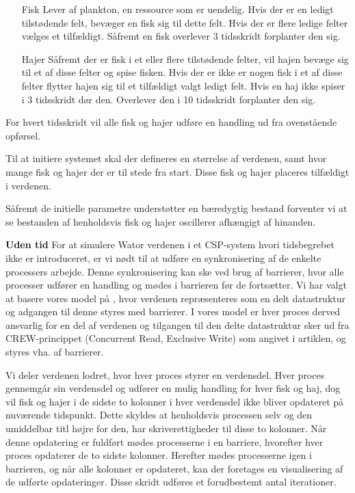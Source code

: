 \begin{itemize}
\item[Fisk]
Lever af plankton, en ressource som er uendelig. Hvis der er en ledigt 
tilstødende felt, bevæger en fisk sig til dette felt. Hvis der er flere ledige 
felter vælges et tilfældigt. Såfremt en fisk overlever 3 tidsskridt forplanter 
den sig.
\item[Hajer]
Såfremt der er fisk i et eller flere tilstødende felter, vil hajen bevæge sig 
til et af disse felter og spise fisken. Hvis der er ikke er nogen fisk i et af 
disse felter flytter hajen sig til et tilfældigt valgt ledigt felt. Hvis en haj 
ikke spiser i 3 tidsskridt dør den. Overlever den i 10 tidsskridt forplanter 
den sig.
\end{itemize}


For hvert tidsskridt vil alle fisk og hajer udføre en handling ud fra
ovenstående opførsel.

Til at initiere systemet skal der defineres en størrelse af verdenen,
samt hvor mange fisk og hajer der er til stede fra start. Disse fisk og
hajer placeres tilfældigt i verdenen.

Såfremt de initielle parametre understøtter en bæredygtig bestand
forventer vi at se bestanden af henholdsvis fisk og hajer oscillerer
afhængigt af hinanden.


\textbf{Uden tid}
For at simulere Wator verdenen i et CSP-system hvori tidsbegrebet ikke er 
introduceret, er vi nødt til at udføre en synkronisering af de enkelte 
processers arbejde. Denne synkronisering kan ske ved brug af barrierer, hvor 
alle processer udfører en handling og mødes i barrieren før de fortsætter.
Vi har valgt at basere vores model på \cite{crew}, hvor verdenen repræsenteres 
som en delt datastruktur og adgangen til denne styres med barrierer. I vores 
model er hver proces derved ansvarlig for en del af verdenen og tilgangen til 
den delte datastruktur sker ud fra CREW-princippet (Concurrent Read, Exclusive 
Write) som angivet i artiklen, og styres vha. af barrierer. 

Vi deler verdenen lodret, hvor hver proces styrer en verdensdel. Hver proces 
gennemgår sin verdensdel og udfører en mulig handling for hver fisk og haj, dog 
vil fisk og hajer i de sidste to kolonner i hver verdensdel ikke bliver 
opdateret på nuværende tidspunkt. Dette skyldes at henholdsvis processen selv 
og den umiddelbar titl højre for den, har skriverettigheder til disse to 
kolonner.
Når denne opdatering er fuldført mødes processerne i en barriere, hvorefter 
hver proces opdaterer de to sidste kolonner. Herefter mødes processerne igen i 
barrieren, og når alle kolonner er opdateret, kan der foretages en 
visualisering af de udførte opdateringer. Disse skridt udføres et forudbestemt 
antal iterationer. 

